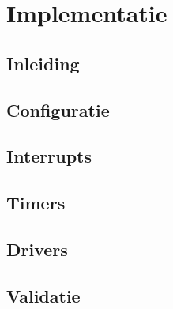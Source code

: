 \chapter{Implementatie}
\section{Inleiding}

\section{Configuratie}
\section{Interrupts}
\section{Timers}
\section{Drivers}
\section{Validatie}

